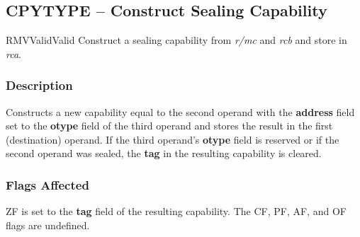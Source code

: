 \clearpage
{}
{}
\subsection*{CPYTYPE -- Construct Sealing Capability}

\begin{x86opcodetable}
  {RMV}{Valid}{Valid}
  {Construct a sealing capability from \emph{r/mc} and \emph{rcb} and
    store in \emph{rca}.}
\end{x86opcodetable}

\begin{x86opentable}
\end{x86opentable}

\subsubsection*{Description}

Constructs a new capability equal to the second operand with the
\textbf{address} field set to the \textbf{otype} field of the third
operand and stores the result in the first (destination) operand.
If the third operand's \textbf{otype} field is reserved or if the
second operand was sealed, the \textbf{tag} in the resulting
capability is cleared.

\subsubsection*{Flags Affected}

ZF is set to the \textbf{tag} field of the resulting capability.  The
CF, PF, AF, and OF flags are undefined.
